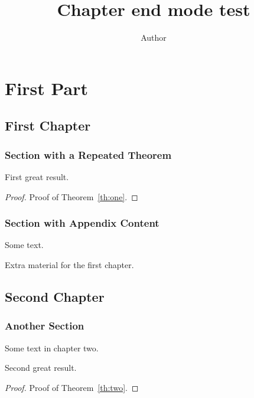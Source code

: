 \documentclass{book}
\title{Chapter end mode test}
\author{Author}
\date{}
\theoremstyle{plain}
\begin{document}
\maketitle

\part{First Part}

\chapter{First Chapter}

\section{Section with a Repeated Theorem}

\begin{theoremrep}
  \label{th:one}%
  First great result.
\end{theoremrep}

\begin{proof}
  Proof of Theorem~\ref{th:one}.
\end{proof}

\section{Section with Appendix Content}

Some text.

\begin{toappendix}
  Extra material for the first chapter.
\end{toappendix}

\chapter{Second Chapter}

\section{Another Section}

Some text in chapter two.

\begin{theoremrep}
  \label{th:two}%
  Second great result.
\end{theoremrep}

\begin{proof}
  Proof of Theorem~\ref{th:two}.
\end{proof}
\end{document}
